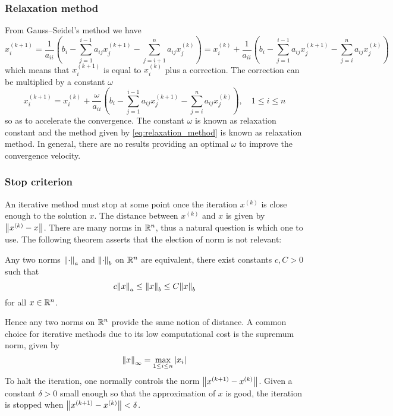 \subsubsection{Relaxation method}

From Gauss--Seidel's method we have
\begin{equation}
    x_i^{(k+1)} = 
    \frac{1}{a_{ii}} 
    \left( b_i - \sum_{j=1}^{i-1} a_{ij} x_j^{(k+1)} - \sum_{j=i+1}^{n} a_{ij} x_j^{(k)} \right) =
    x_i^{(k)} + 
    \frac{1}{a_{ii}} \left( b_i - \sum_{j=1}^{i-1} a_{ij} x_j^{(k+1)} - \sum_{j=i}^{n} a_{ij} x_j^{(k)} \right)
\end{equation}
which means that $x_i^{(k+1)}$ is equal to $x_i^{(k)}$ plus a correction. The
correction can be multiplied by a constant $\omega$
\begin{equation} \label{eq:relaxation_method}
    x_i^{(k+1)} = 
    x_i^{(k)} + 
    \frac{\omega}{a_{ii}} \left( b_i - \sum_{j=1}^{i-1} a_{ij} x_j^{(k+1)} - \sum_{j=i}^{n} a_{ij} x_j^{(k)} \right),
    \quad 1 \leq i \leq n
\end{equation}
so as to accelerate the convergence. The constant $\omega$ is known as
relaxation constant and the method given by \eqref{eq:relaxation_method} is
known as relaxation method. In general, there are no results providing an
optimal $\omega$ to improve the convergence velocity.

\subsubsection{Stop criterion}

An iterative method must stop at some point once the iteration $x^{(k)}$ is
close enough to the solution $x$. The distance between $x^{(k)}$ and $x$ is
given by $\norm{x^{(k)} - x}$. There are many norms in $\mathbb{R}^n$, thus a natural
question is which one to use. The following theorem asserts that the election of
norm is not relevant:

\begin{theorem}
    Any two norms $\norm{\cdot}_a$ and $\norm{\cdot}_b$ on $\mathbb{R}^n$ are
    equivalent, \ie there exist constants $c, C > 0$ such that
    \begin{equation}
        c \norm{x}_a \leq \norm{x}_b \leq C \norm{x}_b
    \end{equation}
    for all $x \in \mathbb{R}^n$.
\end{theorem}

\noindent
Hence any two norms on $\mathbb{R}^n$ provide the same notion of distance. A common
choice for iterative methods due to its low computational cost is the supremum
norm, given by
\begin{equation}
    \norm{x}_\infty = \max_{1 \leq i \leq n} \abs{x_i}
\end{equation}
To halt the iteration, one normally controls the norm $\norm{x^{(k+1)} -
x^{(k)}}$. Given a constant $\delta > 0$ small enough so that the approximation
of $x$ is good, the iteration is stopped when $\norm{x^{(k+1)} - x^{(k)}} <
\delta$.


